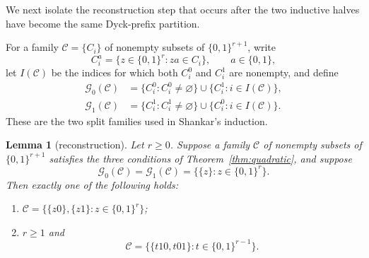 \documentclass[11pt]{article}
\newtheorem{lemma}[theorem]{Lemma}
\theoremstyle{definition}
\newcommand{\bits}{\{0,1\}}
\begin{document}
We next isolate the reconstruction step that occurs after the two inductive halves have become the same Dyck-prefix partition.


For a family $\mathcal C=\{C_i\}$ of nonempty subsets of $\bits^{r+1}$, write
\[
 C_i^a=\{z\in\bits^r:za\in C_i\},\qquad a\in\bits,
\]
let $I(\mathcal C)$ be the indices for which both $C_i^0$ and $C_i^1$ are nonempty, and define
\begin{align*}
 \mathcal G_0(\mathcal C)&=\{C_i^0:C_i^0\ne\varnothing\}\cup\{C_i^1:i\in I(\mathcal C)\},\\
 \mathcal G_1(\mathcal C)&=\{C_i^1:C_i^1\ne\varnothing\}\cup\{C_i^0:i\in I(\mathcal C)\}.
\end{align*}
These are the two split families used in Shankar's induction.

\begin{lemma}[reconstruction]\label{lem:reconstruction}
Let $r\ge0$.  Suppose a family $\mathcal C$ of nonempty subsets of $\bits^{r+1}$ satisfies the three conditions of Theorem~\ref{thm:quadratic}, and suppose
\[
 \mathcal G_0(\mathcal C)=\mathcal G_1(\mathcal C)
 =\bigl\{\{z\}:z\in\bits^r\bigr\}.
\]
Then exactly one of the following holds:
\begin{enumerate}[label=(\alph*)]
 \item
 $\mathcal C=\bigl\{\{z0\},\{z1\}:z\in\bits^r\bigr\}$;
 \item $r\ge1$ and
 \[
 \mathcal C=\bigl\{\{t10,t01\}:t\in\bits^{r-1}\bigr\}.
 \]
\end{enumerate}
\end{lemma}
\end{document}
